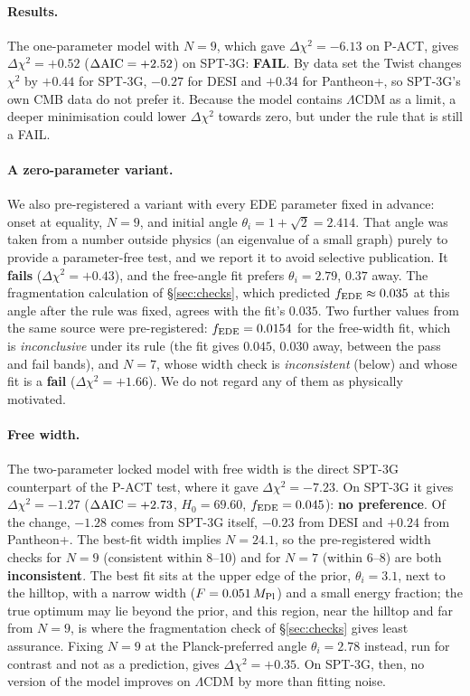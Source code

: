 \documentclass[11pt]{article}
\newcommand{\Mp}{M_{\rm Pl}}
\newcommand{\SPTfreeDchi}{\ensuremath{-1.27}}   %
\newcommand{\SPTfreeHz}{\ensuremath{69.60}}     %
\newcommand{\SPTfreeF}{\ensuremath{0.045}}      %
\newcommand{\SPTfreeN}{\ensuremath{24.1}}       %
\newcommand{\SPTsevenDchi}{\ensuremath{+1.66}}  %
\newcommand{\SPTsevenVerdict}{a \textbf{fail} ($\Delta\chi^2=\SPTsevenDchi$)}
\begin{document}
\paragraph{Results.} The one-parameter model with $N=9$, which gave $\Delta\chi^2=-6.13$ on P-ACT,
gives $\Delta\chi^2=+0.52$ ($\Delta{\rm AIC}=+2.52$) on SPT-3G: \textbf{FAIL}. By data set the Twist
changes $\chi^2$ by $+0.44$ for SPT-3G, $-0.27$ for DESI and $+0.34$ for Pantheon+, so SPT-3G's own CMB
data do not prefer it. Because the model contains $\Lambda$CDM as a limit, a deeper minimisation could
lower $\Delta\chi^2$ towards zero, but under the rule that is still a FAIL.

\paragraph{A zero-parameter variant.} We also pre-registered a variant with every EDE parameter fixed in
advance: onset at equality, $N=9$, and initial angle $\theta_i=1+\sqrt2=2.414$. That angle was taken
from a number outside physics (an eigenvalue of a small graph) purely to provide a parameter-free test,
and we report it to avoid selective publication. It \textbf{fails} ($\Delta\chi^2=+0.43$), and the
free-angle fit prefers $\theta_i=2.79$, $0.37$ away. The fragmentation calculation of
\S\ref{sec:checks}, which predicted $f_{\rm EDE}\approx0.035$ at this angle after the rule was fixed,
agrees with the fit's $0.035$. Two further values from the same source were pre-registered: $f_{\rm EDE}=0.0154$
for the free-width fit, which is \emph{inconclusive} under its rule (the fit gives $0.045$, $0.030$ away, between
the pass and fail bands), and $N=7$, whose width check is \emph{inconsistent} (below) and whose fit is
\SPTsevenVerdict. We do not regard any of them as physically motivated.

\paragraph{Free width.} The two-parameter locked model with free width is the direct SPT-3G counterpart
of the P-ACT test, where it gave $\Delta\chi^2=-7.23$. On SPT-3G it gives $\Delta\chi^2=\SPTfreeDchi$
($\Delta{\rm AIC}=+2.73$, $H_0=\SPTfreeHz$, $f_{\rm EDE}=\SPTfreeF$): \textbf{no preference}. Of the change,
$-1.28$ comes from SPT-3G itself, $-0.23$ from DESI and $+0.24$ from Pantheon+. The best-fit width implies
$N=\SPTfreeN$, so the pre-registered width checks for $N=9$ (consistent within 8--10) and for $N=7$
(within 6--8) are both \textbf{inconsistent}. The best fit sits at the upper edge of the prior,
$\theta_i=3.1$, next to the hilltop, with a narrow width ($F=0.051\,\Mp$) and a small energy fraction; the
true optimum may lie beyond the prior, and this region, near the hilltop and far from $N=9$, is where the
fragmentation check of \S\ref{sec:checks} gives least assurance. Fixing $N=9$ at the Planck-preferred angle
$\theta_i=2.78$ instead, run for contrast and not as a prediction, gives $\Delta\chi^2=+0.35$. On SPT-3G, then,
no version of the model improves on $\Lambda$CDM by more than fitting noise.
\end{document}
